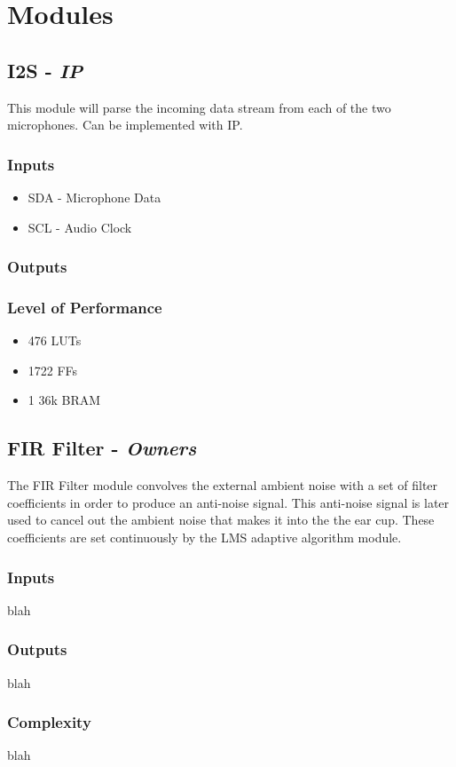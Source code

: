 \documentclass[12pt]{fpgairpods}
\begin{document}
\section{Modules}
\begin{multicols}{2}
\subsection{I2S - \textit{IP}}
This module will parse the incoming data stream from each of the two microphones. Can be implemented with IP.
\subsubsection{Inputs}
\begin{itemize}
    \item SDA - Microphone Data
    \item SCL - Audio Clock
\end{itemize}
\subsubsection{Outputs}
\subsubsection{Level of Performance}
\begin{itemize}
    \item 476 LUTs
    \item 1722 FFs
    \item 1 36k BRAM
\end{itemize}

\subsection{FIR Filter - \textit{Owners}}
The FIR Filter module convolves the external ambient noise with a set of filter coefficients in order to produce an anti-noise signal. This anti-noise signal is later used to cancel out the ambient noise that makes it into the the ear cup. These coefficients are set continuously by the LMS adaptive algorithm module.
\subsubsection{Inputs}
blah
\subsubsection{Outputs}
blah
\subsubsection{Complexity}
blah

\end{multicols}
\end{document}
